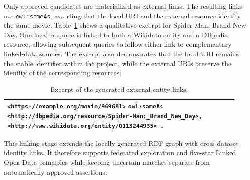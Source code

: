 Only approved candidates are materialized as external links. The resulting
links use \texttt{owl:sameAs}, asserting that the local URI and the external
resource identify the same movie. Table~\ref{tab:linking-output} shows a
qualitative excerpt for Spider-Man: Brand New Day. One local resource is
linked to both a Wikidata entity and a DBpedia resource, allowing subsequent
queries to follow either link to complementary linked-data sources. The
excerpt also demonstrates that the local URI remains the stable identifier
within the project, while the external URIs preserve the identity of the
corresponding resources.

\begin{table}[t]
    \centering
    \caption{Excerpt of the generated external entity links.}
    \label{tab:linking-output}
    \small
    \begin{tabular}{p{0.94\linewidth}}
        \toprule
        \texttt{<https://example.org/movie/969681>} \newline
        \texttt{\quad owl:sameAs} \newline
        \texttt{\quad\quad <http://dbpedia.org/resource/Spider-Man:\_Brand\_New\_Day>,} \newline
        \texttt{\quad\quad <http://www.wikidata.org/entity/Q113244935> .} \\
        \bottomrule
    \end{tabular}
\end{table}

This linking stage extends the locally generated RDF graph with
cross-dataset identity links. It therefore supports federated exploration
and five-star Linked Open Data principles while keeping uncertain matches
separate from automatically approved assertions.
